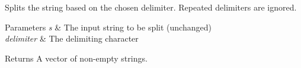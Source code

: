 Splits the string based on the chosen delimiter. Repeated delimiters are ignored. 
\begin{DoxyParams}{Parameters}
{\em s} & The input string to be split (unchanged) \\
\hline
{\em delimiter} & The delimiting character \\
\hline
\end{DoxyParams}
\begin{DoxyReturn}{Returns}
A vector of non-\/empty strings. 
\end{DoxyReturn}
